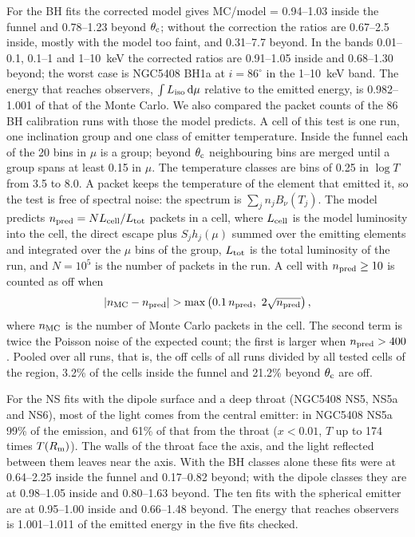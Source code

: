 For the BH fits the corrected model gives MC/model = 0.94--1.03 inside the funnel and 0.78--1.23 beyond $\theta_{\rm c}$; without the correction the ratios are 0.67--2.5 inside, mostly with the model too faint, and 0.31--7.7 beyond.
In the bands 0.01--0.1, 0.1--1 and 1--10~keV the corrected ratios are 0.91--1.05 inside and 0.68--1.30 beyond; the worst case is NGC5408 BH1a at $i = 86^\circ$ in the 1--10~keV band.
The energy that reaches observers, $\int L_{\rm iso}\,{\rm d}\mu$ relative to the emitted energy, is 0.982--1.001 of that of the Monte Carlo.
We also compared the packet counts of the 86 BH calibration runs with those the model predicts.
A cell of this test is one run, one inclination group and one class of emitter temperature.
Inside the funnel each of the 20 bins in $\mu$ is a group; beyond $\theta_{\rm c}$ neighbouring bins are merged until a group spans at least 0.15 in $\mu$.
The temperature classes are bins of 0.25 in $\log T$ from 3.5 to 8.0.
A packet keeps the temperature of the element that emitted it, so the test is free of spectral noise: the spectrum is $\sum_j n_j B_\nu(T_j)$.
The model predicts $n_{\rm pred} = N L_{\rm cell}/L_{\rm tot}$ packets in a cell, where $L_{\rm cell}$ is the model luminosity into the cell, the direct escape plus $S_j h_j(\mu)$ summed over the emitting elements and integrated over the $\mu$ bins of the group, $L_{\rm tot}$ is the total luminosity of the run, and $N = 10^5$ is the number of packets in the run.
A cell with $n_{\rm pred} \ge 10$ is counted as off when
\begin{equation}
|n_{\rm MC} - n_{\rm pred}| > \max\left(0.1\,n_{\rm pred},\ 2\sqrt{n_{\rm pred}}\right) ,
\label{eq:mc_count_test}
\end{equation}
where $n_{\rm MC}$ is the number of Monte Carlo packets in the cell.
The second term is twice the Poisson noise of the expected count; the first is larger when $n_{\rm pred} > 400$.
Pooled over all runs, that is, the off cells of all runs divided by all tested cells of the region, 3.2\% of the cells inside the funnel and 21.2\% beyond $\theta_{\rm c}$ are off.

For the NS fits with the dipole surface and a deep throat (NGC5408 NS5, NS5a and NS6), most of the light comes from the central emitter: in NGC5408 NS5a 99\% of the emission, and 61\% of that from the throat ($x < 0.01$, $T$ up to 174 times $T(R_{\rm m})$).
The walls of the throat face the axis, and the light reflected between them leaves near the axis.
With the BH classes alone these fits were at 0.64--2.25 inside the funnel and 0.17--0.82 beyond; with the dipole classes they are at 0.98--1.05 inside and 0.80--1.63 beyond.
The ten fits with the spherical emitter are at 0.95--1.00 inside and 0.66--1.48 beyond.
The energy that reaches observers is 1.001--1.011 of the emitted energy in the five fits checked.

